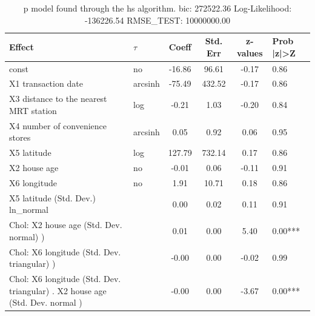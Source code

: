 \begin{table}
	\caption{p model found through the hs algorithm. bic: 272522.36 Log-Likelihood: -136226.54 RMSE_TEST: 10000000.00}
	\begin{center}
		\begin{tabular}{|l|l|c|c|c|l|}
			\hline
			Effect & $\tau$ & Coeff & Std. Err & z-values & Prob |z|>Z \\
			\hline
			const & no & -16.86 & 96.61 & -0.17 & 0.86 \\
			\hline
			X1 transaction date & arcsinh & -75.49 & 432.52 & -0.17 & 0.86 \\
			\hline
			X3 distance to the nearest MRT station & log & -0.21 & 1.03 & -0.20 & 0.84 \\
			\hline
			X4 number of convenience stores & arcsinh & 0.05 & 0.92 & 0.06 & 0.95 \\
			\hline
			X5 latitude & log & 127.79 & 732.14 & 0.17 & 0.86 \\
			\hline
			X2 house age & no & -0.01 & 0.06 & -0.11 & 0.91 \\
			\hline
			X6 longitude & no & 1.91 & 10.71 & 0.18 & 0.86 \\
			\hline
			X5 latitude (Std. Dev.) ln_normal &  & 0.00 & 0.02 & 0.11 & 0.91 \\
			\hline
			 Chol: X2 house age (Std. Dev. normal) ) &  & 0.01 & 0.00 & 5.40 & 0.00*** \\
			\hline
			 Chol: X6 longitude (Std. Dev. triangular) ) &  & -0.00 & 0.00 & -0.02 & 0.99 \\
			\hline
			 Chol: X6 longitude (Std. Dev. triangular) . X2 house age (Std. Dev.   normal ) &  & -0.00 & 0.00 & -3.67 & 0.00*** \\
			\hline
		\end{tabular}
	\end{center}
\end{table}